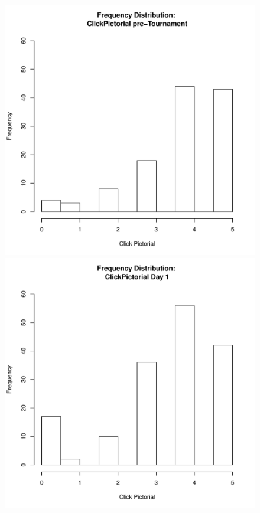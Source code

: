\documentclass[12pt]{report}
\begin{document}
{\begin{figure}[htbp]
  \includegraphics[scale =.4]{../images/distClickPictorialPre.pdf}
  \includegraphics[scale =.4]{../images/distClickPictorialDay1.pdf}

\end{figure}}
\end{document}
